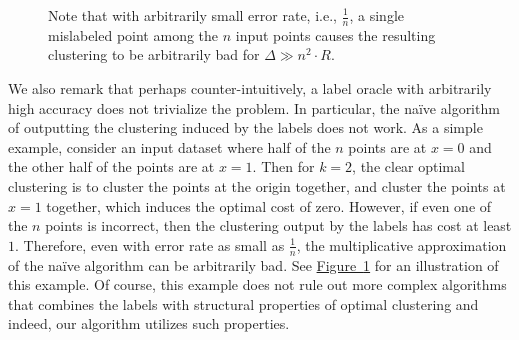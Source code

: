 \documentclass[10pt,a4paper]{amsart}
\newcommand{\namedref}[2]{\hyperref[#2]{#1~\ref*{#2}}}
\newcommand{\figlab}[1]{\label{fig:#1}}
\newcommand{\figref}[1]{\namedref{Figure}{fig:#1}}
\begin{document}
\begin{figure}[!htb]
\centering
{}
\caption{Note that with arbitrarily small error rate, i.e., $\frac{1}{n}$, a single mislabeled point among the $n$ input points causes the resulting clustering to be arbitrarily bad for $\Delta\gg n^2\cdot R$.}
\figlab{fig:aug:bad}
\end{figure}

We also remark that perhaps counter-intuitively, a label oracle with arbitrarily high accuracy does not trivialize the problem. 
In particular, the na\"{i}ve algorithm of outputting the clustering induced by the labels does not work. 
As a simple example, consider an input dataset where half of the $n$ points are at $x=0$ and the other half of the points are at $x=1$. 
Then for $k=2$, the clear optimal clustering is to cluster the points at the origin together, and cluster the points at $x=1$ together, which induces the optimal cost of zero. 
However, if even one of the $n$ points is incorrect, then the clustering output by the labels has cost at least $1$. 
Therefore, even with error rate as small as $\frac{1}{n}$, the multiplicative approximation of the na\"{i}ve algorithm can be arbitrarily bad. 
See \figref{fig:aug:bad} for an illustration of this example. 
Of course, this example does not rule out more complex algorithms that combines the labels with structural properties of optimal clustering and indeed, our algorithm utilizes such properties. 
\end{document}
